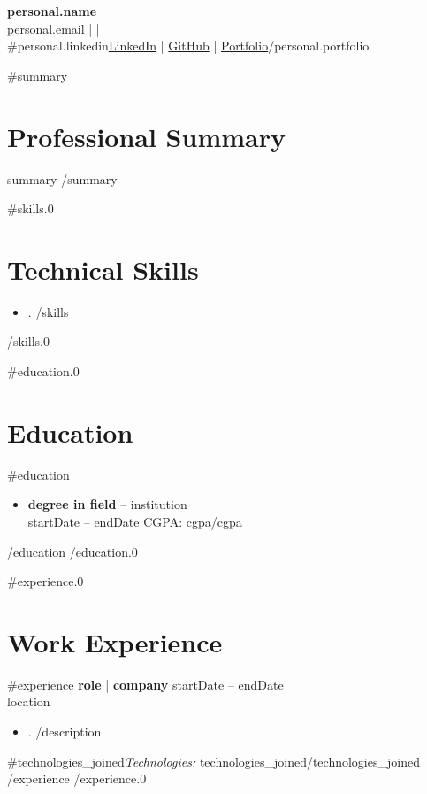 \documentclass[11pt,a4paper]{article}
\begin{document}
\begin{center}
    {\LARGE\bfseries\color{accent} {{personal.name}}}\\[6pt]
    {{personal.email}} \quad |  \quad | \\
    {{#personal.linkedin}}\href{ {{personal.linkedin}} }{LinkedIn} \quad | \href{ {{personal.github}} }{GitHub} \quad | \href{ {{personal.portfolio}} }{Portfolio}{{/personal.portfolio}}
\end{center}

{{#summary}}
\section{Professional Summary}
 {{summary}}
{{/summary}}

{{#skills.0}}
\section{Technical Skills}
\begin{itemize}[leftmargin=*,nosep]
 {{#skills}}
    \item {{.}}
 {{/skills}}
\end{itemize}
{{/skills.0}}

{{#education.0}}
\section{Education}
 {{#education}}
\begin{itemize}[leftmargin=*,nosep]
    \item \textbf{ {{degree}} in {{field}} } -- {{institution}}\\
      {{startDate}} -- {{endDate}}  \quad CGPA: {{cgpa}}{{/cgpa}}
\end{itemize}
 {{/education}}
{{/education.0}}

{{#experience.0}}
\section{Work Experience}
 {{#experience}}
\textbf{ {{role}} } | \textbf{ {{company}} } \hfill {{startDate}} -- {{endDate}}\\
 {{location}}
\begin{itemize}[leftmargin=*,nosep]
 {{#description}}
    \item {{.}}
 {{/description}}
\end{itemize}
 {{#technologies_joined}}\textit{Technologies:} {{technologies_joined}}{{/technologies_joined}}
 {{/experience}}
{{/experience.0}}
\end{document}
